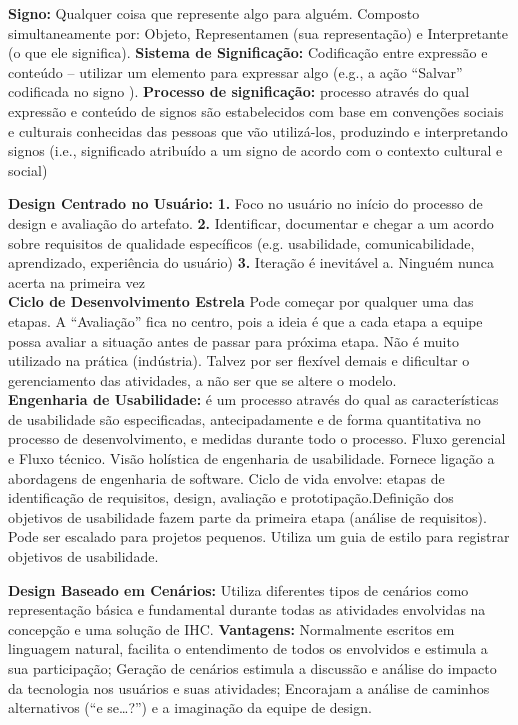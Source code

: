 \documentclass[9pt, twocolumn, article]{memoir}
\begin{document}
\textbf{Signo:} Qualquer coisa que represente algo para alguém. Composto simultaneamente por: Objeto, Representamen (sua representação) e Interpretante (o que ele significa).
\textbf{Sistema de Significação: } Codificação entre expressão e conteúdo – utilizar um elemento para expressar algo (e.g., a ação “Salvar” codificada no signo ).\textbf{ Processo de significação: } processo através do qual expressão e conteúdo de signos são
estabelecidos com base em convenções sociais e culturais conhecidas das pessoas que vão utilizá-los, produzindo e interpretando signos (i.e., significado atribuído a um signo de acordo com o contexto cultural e social)

\textbf{Design Centrado no Usuário: }
\textbf{1.} Foco no usuário no início do processo de design e avaliação do artefato.
\textbf{2.} Identificar, documentar e chegar a um acordo sobre
requisitos de qualidade específicos (e.g. usabilidade, comunicabilidade, aprendizado, experiência do usuário)
\textbf{3.} Iteração é inevitável
a. Ninguém nunca acerta na primeira vez \\

\textbf{Ciclo de Desenvolvimento Estrela}
Pode começar por qualquer uma das etapas. A “Avaliação” fica no centro, pois a ideia é que a cada etapa a equipe possa avaliar a situação antes de passar para próxima etapa. Não é muito utilizado na prática (indústria). Talvez por ser flexível demais e
dificultar o gerenciamento das atividades, a não ser que se altere o
modelo. \\

\textbf{Engenharia de Usabilidade: }é um processo através do qual as
características de usabilidade são especificadas, antecipadamente e de forma quantitativa no processo de desenvolvimento, e medidas durante todo o processo. Fluxo gerencial e Fluxo técnico. 
Visão holística de engenharia de usabilidade. Fornece ligação a abordagens de engenharia de software. Ciclo de vida envolve: etapas de identificação de requisitos, design, avaliação e prototipação.Definição dos objetivos de usabilidade fazem parte da primeira etapa (análise de requisitos). Pode ser escalado para projetos pequenos. Utiliza um guia de estilo para registrar objetivos de usabilidade.

\textbf{Design Baseado em Cenários:} Utiliza diferentes tipos de cenários como representação básica e fundamental durante todas as
atividades envolvidas na concepção e uma solução de IHC. \textbf{Vantagens: } Normalmente escritos em linguagem natural, facilita o entendimento de todos os envolvidos e estimula a sua participação; Geração de cenários estimula a discussão e análise do impacto da tecnologia nos usuários e suas atividades; Encorajam a análise de caminhos alternativos (“e se…?”) e a imaginação da equipe de design.
\end{document}
